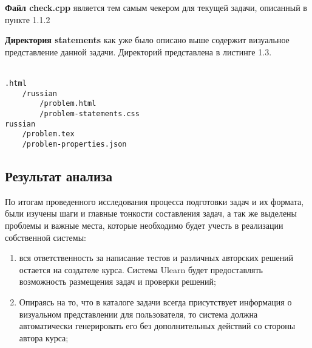 \textbf{Файл check.cpp} является тем самым чекером для текущей задачи, описанный в пункте 1.1.2

\textbf{Директория statements} как уже было описано выше содержит визуальное представление данной задачи. Директорий представлена в листинге 1.3.
\\ \\
\begin{lstlisting}[caption={Пример содержимого директории statements}]
.html
    /russian                     
        /problem.html
        /problem-statements.css
russian
    /problem.tex
    /problem-properties.json
\end{lstlisting}


\subsection{Результат анализа}
По итогам проведенного исследования процесса подготовки задач и их формата, были изучены шаги и главные тонкости составления задач, а так же выделены проблемы и важные места, которые необходимо будет учесть в реализации собственной системы:
\begin{enumerate}
    \item вся ответственность за написание тестов и различных авторских решений остается на создателе курса. Система Ulearn будет предоставлять возможность размещения задач и проверки решений;
    \item Опираясь на то, что в каталоге задачи всегда присутствует информация о визуальном представлении для пользователя, то система должна автоматически генерировать его без дополнительных действий со стороны автора курса;
\end{enumerate}








